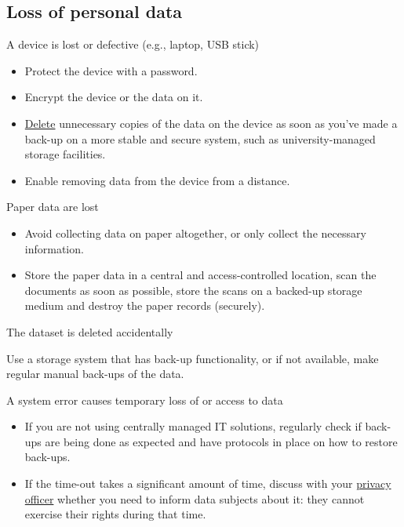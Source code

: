\documentclass[
]{book}
\providecommand{\tightlist}{%
  \setlength{\itemsep}{0pt}\setlength{\parskip}{0pt}}
\begin{document}
\hypertarget{loss-of-personal-data}{%
\subsection{Loss of personal data}\label{loss-of-personal-data}}

A device is lost or defective (e.g., laptop, USB stick)

\begin{itemize}
\tightlist
\item
  Protect the device with a password.
\item
  Encrypt the device or the data on it.
\item
  \protect\hyperlink{deleting-personal-data}{Delete} unnecessary copies of the data on the
  device as soon as you've made a back-up on a more stable and secure system,
  such as university-managed storage facilities.
\item
  Enable removing data from the device from a distance.
\end{itemize}

Paper data are lost

\begin{itemize}
\tightlist
\item
  Avoid collecting data on paper altogether, or only collect the necessary
  information.\\
\item
  Store the paper data in a central and access-controlled location, scan the
  documents as soon as possible, store the scans on a backed-up storage medium
  and destroy the paper records (securely).\\
\end{itemize}

The dataset is deleted accidentally

Use a storage system that has back-up functionality, or if not available, make
regular manual back-ups of the data.

A system error causes temporary loss of or access to data

\begin{itemize}
\tightlist
\item
  If you are not using centrally managed IT solutions, regularly check if
  back-ups are being done as expected and have protocols in place on how to
  restore back-ups.
\item
  If the time-out takes a significant amount of time, discuss with your
  \protect\hyperlink{support}{privacy officer} whether you need to inform data subjects about it:
  they cannot exercise their rights during that time.\\
\end{itemize}
\end{document}
